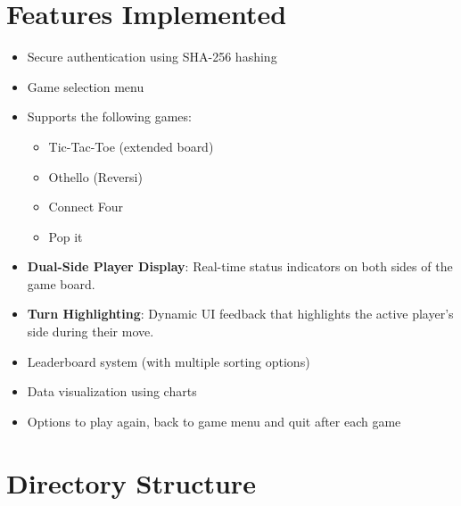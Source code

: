 \documentclass[12pt,a4paper]{article}
\begin{document}
\section{Features Implemented}
\begin{itemize}
    \item Secure authentication using SHA-256 hashing
    \item Game selection menu
    \item Supports the following games:
    \begin{itemize}
        \item Tic-Tac-Toe (extended board)
        \item Othello (Reversi)
        \item Connect Four
        \item Pop it
    \end{itemize}
    \item \textbf{Dual-Side Player Display}: Real-time status indicators on both sides of the game board.
    \item \textbf{Turn Highlighting}: Dynamic UI feedback that highlights the active player's side during their move.
    \item Leaderboard system (with multiple sorting options)
    \item Data visualization using charts
    \item Options to play again, back to game menu and quit after each game
\end{itemize}
\section{Directory Structure}
\end{document}
